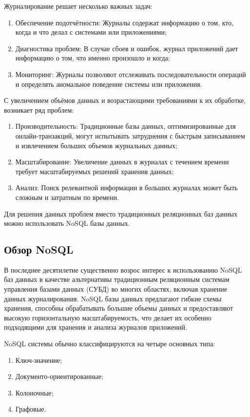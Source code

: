 \documentclass[14pt, russian]{scrartcl}
\begin{document}
Журналирование решает несколько важных задач:

\begin{enumerate}
	\item Обеспечение подотчётности: Журналы содержат информацию о том, кто, когда и что делал с системами или приложениями;
	\item Диагностика проблем: В случае сбоев и ошибок, журнал приложений дает информацию о том, что именно произошло и когда;
	\item Мониторинг: Журналы позволяют отслеживать последовательности операций и определять аномальное поведение системы или приложения.
\end{enumerate}

С увеличением объёмов данных и возрастающими требованиями к их обработке, возникает ряд проблем:

\begin{enumerate}
	\item Производительность: Традиционные базы данных, оптимизированные для онлайн-транзакций, могут испытывать затруднения с быстрым записыванием и извлечением больших объемов журнальных данных;
	\item Масштабирование: Увеличение данных в журналах с течением времени требует масштабируемых решений хранения данных;
	\item Анализ: Поиск релевантной информации в больших журналах может быть сложным и затратным по времени.
\end{enumerate}

Для решения данных проблем вместо традиционных реляционных баз данных можно использовать NoSQL базы данных.

\subsection{Обзор NoSQL}

В последнее десятилетие существенно возрос интерес к использованию NoSQL баз данных в качестве альтернативы традиционным реляционным системам управления базами данных (СУБД) во многих областях, включая хранение данных журналирования. NoSQL базы данных предлагают гибкие схемы хранения, способны обрабатывать большие объемы данных и предоставляют высокую горизонтальную масштабируемость, что делает их особенно подходящими для хранения и анализа журналов приложений.

NoSQL системы обычно классифицируются на четыре основных типа:

\begin{enumerate}
	\item Ключ-значение;
	\item Документо-ориентированные;
	\item Колоночные;
	\item Графовые.
\end{enumerate}
\end{document}
